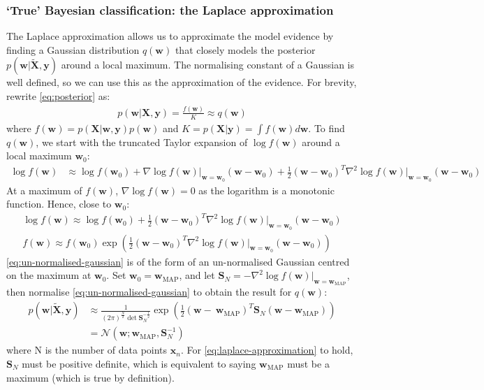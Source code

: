 \documentclass[a4paper]{article}
\begin{document}
    \subsubsection{`True' Bayesian classification: the Laplace approximation}
    The Laplace approximation allows us to approximate the model evidence by finding a Gaussian distribution $q(\bm{w})$ that closely models the posterior $p(\bm{w} | \tilde{\bm{X}}, \bm{y})$ around a local maximum.
    The normalising constant of a Gaussian is well defined, so we can use this as the approximation of the evidence.
    For brevity, rewrite \autoref{eq:posterior} as:
    \begin{align}
        p(\bm{w} | \bm{X}, \bm{y}) = \frac{f(\bm{w})}{K} \approx q(\bm{w})
    \end{align}
    where $f(\bm{w}) = p(\bm{X} | \bm{w}, \bm{y}) p(\bm w)$ and $K = p(\bm{X} | \bm{y}) = \int f(\bm{w}) d\bm{w}$.
    To find $q(\bm{w})$, we start with the truncated Taylor expansion of $\log f(\bm{w})$ around a local maximum $\bm{w}_0$:
    \begin{align}
        \nonumber
        \log f(\bm{w}) &\approx \log f(\bm{w}_0) + \nabla \log f(\bm{w}) \big|_{\bm{w} = \bm{w}_0} (\bm{w} - \bm{w}_0)
        + \frac{1}{2} (\bm{w} - \bm{w}_0)^T \nabla^2 \log f(\bm{w}) \big|_{\bm{w} = \bm{w}_0} (\bm{w} - \bm{w}_0)
    \end{align}
    At a maximum of $f(\bm{w})$, $\nabla \log f(\bm{w}) = 0$ as the logarithm is a monotonic function.
    Hence, close to $\bm{w}_0$:
    \begin{align}
        \log f(\bm{w}) \approx \log f(\bm{w}_0) + \frac{1}{2} (\bm{w} - \bm{w}_0)^T \nabla^2 \log f(\bm{w}) \big|_{\bm{w} = \bm{w}_0} (\bm{w} - \bm{w}_0) \nonumber \\
        f(\bm{w}) \approx f(\bm{w}_0) \exp \left(\frac{1}{2} (\bm{w} - \bm{w}_0)^T \nabla^2 \log f(\bm{w}) \big|_{\bm{w} = \bm{w}_0} (\bm{w} - \bm{w}_0) \right)
        \label{eq:un-normalised-gaussian}
    \end{align}
    \autoref{eq:un-normalised-gaussian} is of the form of an un-normalised Gaussian centred on the maximum at $\bm{w}_0$.
    Set $\bm{w}_0 = \bm{w}_\text{MAP}$, and let $\bm{S}_N = -\nabla^2 \log f(\bm{w})\big|_{\bm{w} = \bm{w}_\text{MAP}}$,
    then normalise \autoref{eq:un-normalised-gaussian} to obtain the result for $q(\bm{w})$:
    \begin{align}
        p(\bm{w} | \tilde{\bm{X}}, \bm{y}) &\approx \frac{1}{(2\pi)^\frac{N}{2} \det\bm{S}_N^{-\frac{1}{2}}} \exp \left(\frac{1}{2} (\bm{w} - \ \bm{w}_\text{MAP})^T \bm{S}_N (\bm{w} -  \bm{w}_\text{MAP}) \right) \nonumber \\
        &= \mathcal{N}(\bm{w};  \bm{w}_\text{MAP}, \bm{S}_N^{-1})
        \label{eq:laplace-approximation}
    \end{align}
    where N is the number of data points $\bm{x}_n$.
    For \autoref{eq:laplace-approximation} to hold, $\bm{S}_N$ must be positive definite, which is equivalent to saying $\bm{w}_\text{MAP}$ must be a maximum (which is true by definition).
\end{document}
